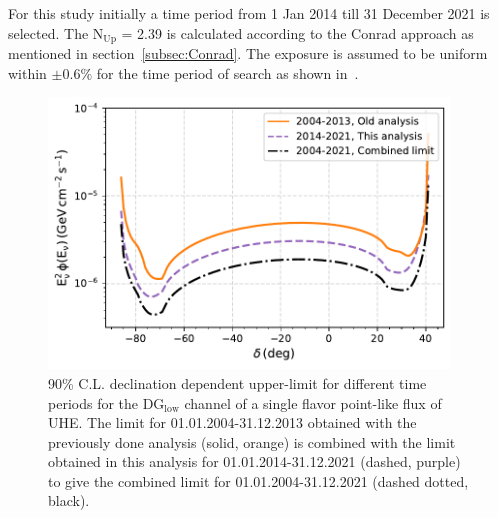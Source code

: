 For this study initially a time period from 1 Jan 2014 till 31 December 2021 is selected. The N$_{\text{Up}}$ = 2.39 is calculated according to the Conrad approach as mentioned in section~\ref{subsec:Conrad}. The exposure is assumed to be uniform within $\pm 0.6\%$ for the time period of search as shown in~\cite{PierreAuger:2017pzq}. 

\begin{figure}[th!]
  \centering
  \includegraphics[width=0.95\textwidth]{thesis_figures/PointLimits/Point_comp_combined.pdf}
  \caption{90\% C.L. declination dependent upper-limit for different time periods for the DG$_{\text{low}}$ channel of a single flavor point-like flux of UHE. The limit for 01.01.2004-31.12.2013 obtained with the previously done analysis (solid, orange) is combined with the limit obtained in this analysis for 01.01.2014-31.12.2021 (dashed, purple) to give the combined limit for 01.01.2004-31.12.2021 (dashed dotted, black).}
  \label{fig:Dec_limit_comb1}
\end{figure}


